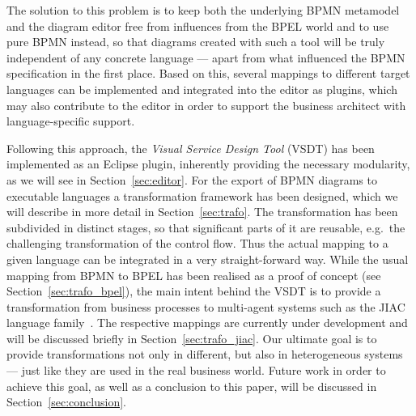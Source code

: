 The solution to this problem is to keep both the underlying BPMN metamodel and the diagram editor free from influences from the BPEL world and to use pure BPMN instead, so that diagrams created with such a tool will be truly independent of any concrete language --- apart from what influenced the BPMN specification in the first place.  Based on this, several mappings to different target languages can be implemented and integrated into the editor as plugins, which may also contribute to the editor in order to support the business architect with language-specific support.

Following this approach, the \emph{Visual Service Design Tool} (VSDT) has been implemented as an Eclipse plugin, inherently providing the necessary modularity, as we will see in Section~\ref{sec:editor}.  For the export of BPMN diagrams to executable languages a transformation framework has been designed, which we will describe in more detail in Section~\ref{sec:trafo}.  The transformation has been subdivided in distinct stages, so that significant parts of it are reusable, e.g.\ the challenging transformation of the control flow.  Thus the actual mapping to a given language can be integrated in a very straight-forward way.  While the usual mapping from BPMN to BPEL has been realised as a proof of concept (see Section~\ref{sec:trafo_bpel}), the main intent behind the VSDT is to provide a transformation from business processes to multi-agent systems such as the JIAC language family~\cite{sesseler2002modularearchitektur}.  The respective mappings are currently under development and will be discussed briefly in Section~\ref{sec:trafo_jiac}.  Our ultimate goal is to provide transformations not only in different, but also in heterogeneous systems --- just like they are used in the real business world.  Future work in order to achieve this goal, as well as a conclusion to this paper, will be discussed in Section~\ref{sec:conclusion}.
